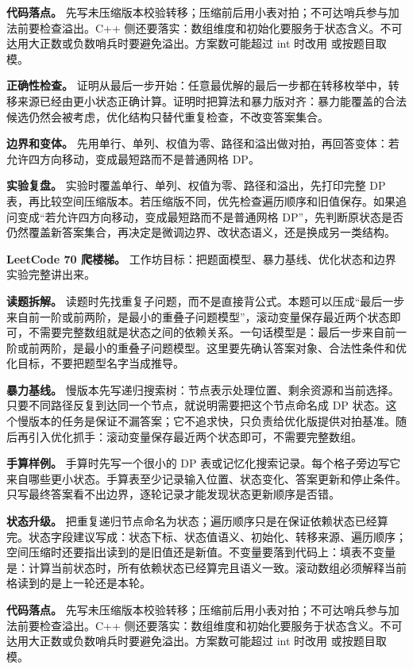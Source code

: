 \textbf{代码落点。} 先写未压缩版本校验转移；压缩前后用小表对拍；不可达哨兵参与加法前要检查溢出。C++ 侧还要落实：数组维度和初始化要服务于状态含义。不可达用大正数或负数哨兵时要避免溢出。方案数可能超过 int 时改用  或按题目取模。

\textbf{正确性检查。} 证明从最后一步开始：任意最优解的最后一步都在转移枚举中，转移来源已经由更小状态正确计算。证明时把算法和暴力版对齐：暴力能覆盖的合法候选仍然会被考虑，优化结构只替代重复检查，不改变答案集合。

\textbf{边界和变体。} 先用单行、单列、权值为零、路径和溢出做对拍，再回答变体：若允许四方向移动，变成最短路而不是普通网格 DP。

\textbf{实验复盘。} 实验时覆盖单行、单列、权值为零、路径和溢出，先打印完整 DP 表，再比较空间压缩版本。若压缩版不同，优先检查遍历顺序和旧值保存。如果追问变成“若允许四方向移动，变成最短路而不是普通网格 DP”，先判断原状态是否仍然覆盖新答案集合，再决定是微调边界、改状态语义，还是换成另一类结构。

\noindent\textbf{LeetCode 70 爬楼梯。} 工作坊目标：把题面模型、暴力基线、优化状态和边界实验完整讲出来。

\textbf{读题拆解。} 读题时先找重复子问题，而不是直接背公式。本题可以压成“最后一步来自前一阶或前两阶，是最小的重叠子问题模型”，滚动变量保存最近两个状态即可，不需要完整数组就是状态之间的依赖关系。一句话模型是：最后一步来自前一阶或前两阶，是最小的重叠子问题模型。这里要先确认答案对象、合法性条件和优化目标，不要把题型名字当成推导。

\textbf{暴力基线。} 慢版本先写递归搜索树：节点表示处理位置、剩余资源和当前选择。只要不同路径反复到达同一个节点，就说明需要把这个节点命名成 DP 状态。这个慢版本的任务是保证不漏答案；它不追求快，只负责给优化版提供对拍基准。随后再引入优化抓手：滚动变量保存最近两个状态即可，不需要完整数组。

\textbf{手算样例。} 手算时先写一个很小的 DP 表或记忆化搜索记录。每个格子旁边写它来自哪些更小状态。手算表至少记录输入位置、状态变化、答案更新和停止条件。只写最终答案看不出边界，逐轮记录才能发现状态更新顺序是否错。

\textbf{状态升级。} 把重复递归节点命名为状态；遍历顺序只是在保证依赖状态已经算完。状态字段建议写成：状态下标、状态值语义、初始化、转移来源、遍历顺序；空间压缩时还要指出读到的是旧值还是新值。不变量要落到代码上：填表不变量是：计算当前状态时，所有依赖状态已经算完且语义一致。滚动数组必须解释当前格读到的是上一轮还是本轮。

\textbf{代码落点。} 先写未压缩版本校验转移；压缩前后用小表对拍；不可达哨兵参与加法前要检查溢出。C++ 侧还要落实：数组维度和初始化要服务于状态含义。不可达用大正数或负数哨兵时要避免溢出。方案数可能超过 int 时改用  或按题目取模。


